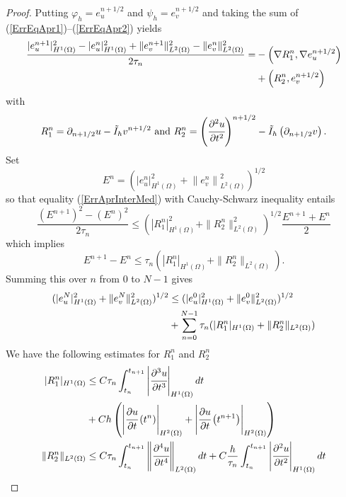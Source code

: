 \documentclass{imanum}
\begin{document}
\begin{proof}
Putting $\varphi_h = e_u^{n + 1 / 2}$ and $\psi_h = e_v^{n + 1 / 2}$ and taking the sum of (\ref{ErrEqApr1})--(\ref{ErrEqApr2}) yields
   \begin{align}
   \label{ErrAprInterMed}
   \frac{| e^{n + 1}_u |_{H^1(\Omega)}^2 - | e^n_u |_{H^1(\Omega)}^2 + \| e^{n + 1}_v \|_{L^2(\Omega)}^2 - \|
     e^n_v \|_{L^2(\Omega)}^2}{2 \tau_n} = &- \left( \nabla R^n_1, \nabla e_u^{n + 1 / 2}\right) \\
     \notag &+ \left(R^n_2, e_v^{n + 1 / 2}\right)  
   \end{align}
  with
  \begin{align*}
  R^n_1 = \partial_{n + 1 / 2} u - \tilde I_hv^{n + 1 / 2} \text{ and }
  R^n_2 = \left( \cfrac{\partial^2 u}{\partial t^2}\right)^{n + 1 / 2} - \tilde I_h \left( \partial_{n + 1 / 2}v\right).
  \end{align*}
Set
\[ E^n = \left(\left|e^n_u \right|_{H^1 (\Omega)}^2 +\left\|e^n_v \right\|_{L^2
   (\Omega)}^2\right)^{1/2} \]
so that equality (\ref{ErrAprInterMed}) with Cauchy-Schwarz inequality entails
\[ \frac{(E^{n + 1})^2 - (E^n)^2}{2 \tau_n} \leq \left(|R^n_1 |_{H^1 (\Omega)}^2
   +\|R^n_2 \|_{L^2 (\Omega)}^2\right)^{1/2} \frac{E^{n + 1} + E^n}{2} 
\]  
which implies
\[ E^{n + 1} - E^n \leq
   \tau_n\left(|R^n_1 |_{H^1 (\Omega)} +\|R^n_2 \|_{L^2 (\Omega)}\right). 
\]  
Summing this over $n$ from 0 to $N - 1$ gives
\begin{align}
\label{sumeN}  (|e^N_u |_{H^1 (\Omega)}^2 +\|e^N_v \|_{L^2
  (\Omega)}^2)^{{1}/{2}} &\leq (|e^0_u |_{H^1 (\Omega)}^2 + \|e^0_v
  \|_{L^2 (\Omega)}^2)^{{1}/{2}}\\
\notag   &+ \sum_{n = 0}^{N - 1} \tau_n (|R^n_1 |_{H^1 (\Omega)} +\|R^n_2 \|_{L^2
  (\Omega)}) 
\end{align} 
We have the following estimates for $R^n_1$ and $R^n_2$
\begin{align}
\label{Rn1} |R^n_1 |_{H^1(\Omega)} &\leq C \tau_n  \int_{t_n}^{t_{n + 1}} \left\vert \cfrac{\partial^3
   u}{\partial t^3} \right\vert_{H^1(\Omega)} dt\\
\notag   &+ Ch\left(
   \left\vert \cfrac{\partial u}{\partial t} \left(t^n\right) \right\vert_{H^2(\Omega)}
   + \left\vert \cfrac{\partial u}{\partial t} \left(t^{n+1}\right) \right\vert_{H^2(\Omega)}
   \right)\\
\label{Rn2}\|R^n_2 \|_{L^2(\Omega)} &\leq C \tau_n  \int_{t_n}^{t_{n + 1}}\left\Vert \cfrac{\partial^4
   u}{\partial t^4} \right\Vert_{L^2(\Omega)} dt + C \frac{h}{\tau_n}  \int_{t_n}^{t_{n + 1}} \left\vert \cfrac{\partial^2
   u}{\partial t^2} \right\vert_{H^1(\Omega)} dt

\end{align}
\end{proof}
\end{document}
